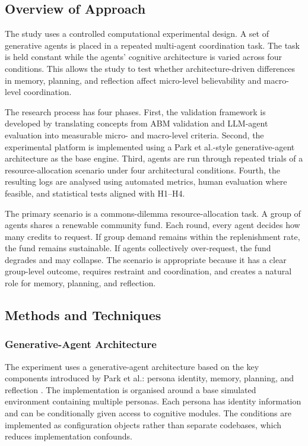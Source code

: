 \documentclass[11pt]{article}
\begin{document}
\subsection{Overview of Approach}
The study uses a controlled computational experimental design. A set of generative agents is placed in a repeated multi-agent coordination task. The task is held constant while the agents' cognitive architecture is varied across four conditions. This allows the study to test whether architecture-driven differences in memory, planning, and reflection affect micro-level believability and macro-level coordination.

The research process has four phases. First, the validation framework is developed by translating concepts from ABM validation and LLM-agent evaluation into measurable micro- and macro-level criteria. Second, the experimental platform is implemented using a Park et al.-style generative-agent architecture as the base engine. Third, agents are run through repeated trials of a resource-allocation scenario under four architectural conditions. Fourth, the resulting logs are analysed using automated metrics, human evaluation where feasible, and statistical tests aligned with H1--H4.

The primary scenario is a commons-dilemma resource-allocation task. A group of agents shares a renewable community fund. Each round, every agent decides how many credits to request. If group demand remains within the replenishment rate, the fund remains sustainable. If agents collectively over-request, the fund degrades and may collapse. The scenario is appropriate because it has a clear group-level outcome, requires restraint and coordination, and creates a natural role for memory, planning, and reflection.

\subsection{Methods and Techniques}

\subsubsection{Generative-Agent Architecture}
The experiment uses a generative-agent architecture based on the key components introduced by Park et al.: persona identity, memory, planning, and reflection \cite{park2023generative}. The implementation is organised around a base simulated environment containing multiple personas. Each persona has identity information and can be conditionally given access to cognitive modules. The conditions are implemented as configuration objects rather than separate codebases, which reduces implementation confounds.
\end{document}
